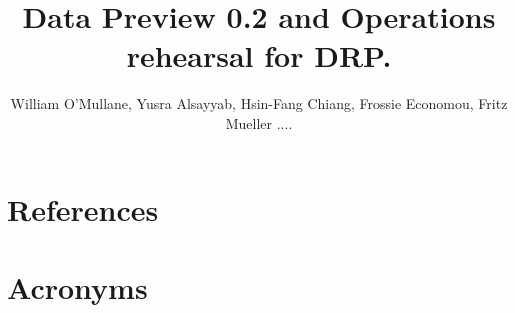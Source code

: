 \documentclass[OPS,authoryear,toc]{lsstdoc}
\title{Data Preview 0.2 and Operations rehearsal for DRP.}
\author{%
William O'Mullane, Yusra Alsayyab, Hsin-Fang Chiang, Frossie Economou, Fritz Mueller ....
}
\date{\vcsDate}
\begin{document}
\maketitle


\appendix
\section{References} \label{sec:bib}
\renewcommand{\refname}{} %


\section{Acronyms} \label{sec:acronyms}

\end{document}
